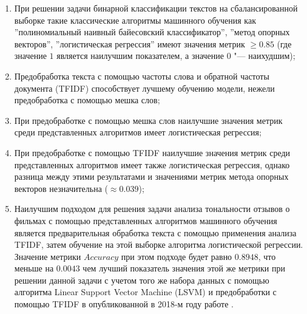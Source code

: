\documentclass[bachelor, och, coursework]{SCWorks}
\begin{document}
    \begin{enumerate}
        \item При решении задачи бинарной классификации текстов на
        сбалансированной выборке такие классические алгоритмы машинного обучения
        как ''полиномиальный наивный байесовский классификатор'', ''метод
        опорных векторов'', ''логистическая регрессия'' имеют значения метрик
        $\geq 0.85$ (где значение $1$ является наилучшим показателем, а значение
        $0$ "--- наихудшим);
        \item Предобработка текста с помощью частоты слова и обратной частоты
        документа (TFIDF) способствует лучшему обучению модели, нежели
        предобработка с помощью мешка слов;
        \item При предобработке с помощью мешка слов наилучшие значения метрик
        среди представленных алгоритмов имеет логистическая регрессия;
        \item При предобработке с помощью TFIDF наилучшие значения метрик среди
        представленных алгоритмов имеет также логистическая регрессия, однако
        разница между этими результатами и значениями метрик метода опорных
        векторов незначительна ($\approx 0.039$);
        \item Наилучшим подходом для решения задачи анализа тональности отзывов
        о фильмах с помощью представленных алгоритмов машинного обучения
        является предварительная обработка текста с помощью применения анализа
        TFIDF, затем обучение на этой выборке алгоритма логистической регрессии.
        Значение метрики $Accuracy$ при этом подходе будет равно $0.8948$, что
        меньше на $0.0043$ чем лучший показатель значения этой же метрики при
        решении данной задачи с учетом того же набора данных с помощью алгоритма
        Linear Support Vector Machine (LSVM) и предобработки с помощью TFIDF в
        опубликованной в 2018-м году работе \cite{tfidf}.
    \end{enumerate}
\end{document}
